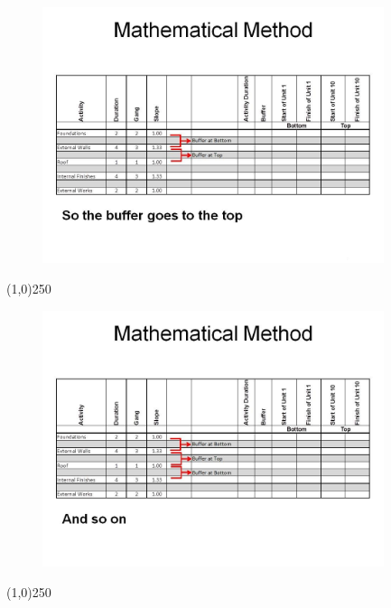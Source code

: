 \begin{frame}
\begin{figure}
	\centering
		\includegraphics[width = 10.0cm]{oldnotes/Slide276.jpg}
\end{figure}
\end{frame}
\begin{center}\line(1,0){250}\end{center}






\begin{frame}
\begin{figure}
	\centering
		\includegraphics[width = 10.0cm]{oldnotes/Slide277.jpg}
\end{figure}
\end{frame}
\begin{center}\line(1,0){250}\end{center}






